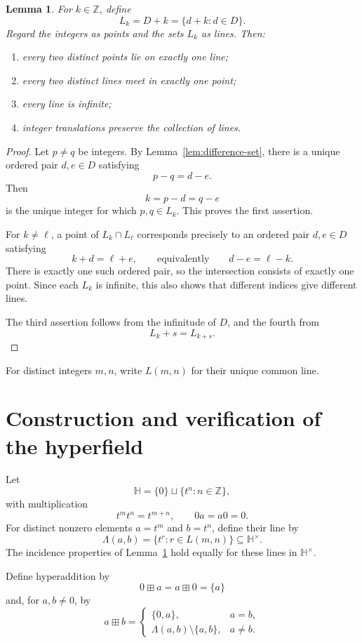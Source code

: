 \documentclass[11pt]{article}
\newcommand{\ZZ}{\mathbb{Z}}
\newcommand{\HH}{\mathbb{H}}
\newtheorem{lemma}[theorem]{Lemma}
\begin{document}
\begin{lemma}\label{lem:incidence}
For \(k\in\ZZ\), define
\[
    L_k=D+k=\{d+k:d\in D\}.
\]
Regard the integers as points and the sets \(L_k\) as lines. Then:
\begin{enumerate}
    \item every two distinct points lie on exactly one line;
    \item every two distinct lines meet in exactly one point;
    \item every line is infinite;
    \item integer translations preserve the collection of lines.
\end{enumerate}
\end{lemma}

\begin{proof}
Let \(p\neq q\) be integers. By Lemma~\ref{lem:difference-set}, there is a
unique ordered pair \(d,e\in D\) satisfying
\[
    p-q=d-e.
\]
Then
\[
    k=p-d=q-e
\]
is the unique integer for which \(p,q\in L_k\). This proves the first
assertion.

For \(k\neq \ell\), a point of \(L_k\cap L_\ell\) corresponds precisely to
an ordered pair \(d,e\in D\) satisfying
\[
    k+d=\ell+e,
    \qquad\text{equivalently}\qquad
    d-e=\ell-k.
\]
There is exactly one such ordered pair, so the intersection consists of
exactly one point. Since each \(L_k\) is infinite, this also shows that
different indices give different lines.

The third assertion follows from the infinitude of \(D\), and the fourth
from
\[
    L_k+s=L_{k+s}.
\]
\end{proof}

For distinct integers \(m,n\), write \(L(m,n)\) for their unique common
line.

\section{Construction and verification of the hyperfield}

Let
\[
    \HH=\{0\}\sqcup\{t^n:n\in\ZZ\},
\]
with multiplication
\[
    t^m t^n=t^{m+n},\qquad 0a=a0=0.
\]
For distinct nonzero elements \(a=t^m\) and \(b=t^n\), define their line by
\[
    \Lambda(a,b)=\{t^r:r\in L(m,n)\}\subseteq\HH^\times.
\]
The incidence properties of Lemma~\ref{lem:incidence} hold equally for these
lines in \(\HH^\times\).

Define hyperaddition by
\[
    0\boxplus a=a\boxplus 0=\{a\}
\]
and, for \(a,b\neq 0\), by
\begin{equation}\label{eq:addition}
    a\boxplus b=
    \begin{cases}
        \{0,a\},&a=b,\\[2mm]
        \Lambda(a,b)\setminus\{a,b\},&a\neq b.
    \end{cases}
\end{equation}
\end{document}
